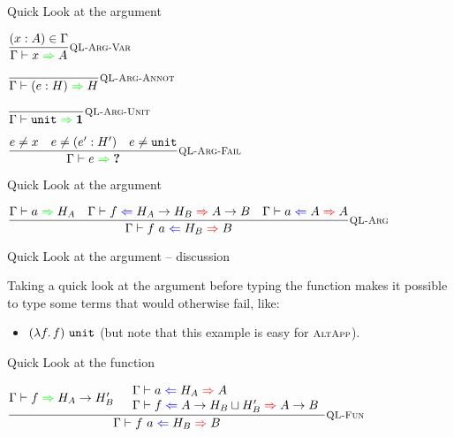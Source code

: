 \documentclass{beamer}
\begin{document}
\begin{frame}{Quick Look at the argument}

\begin{center}
  $\infrule[QL-Arg-Var]{\sidecond{(x : A) \in \Gamma}}{\quicklookinfer{x}{A}}$

  \vspace{2em}

  $\infrule[QL-Arg-Annot]{}{\quicklookinfer{\annot{e}{H}}{H}}$

  \vspace{2em}

  $\infrule[QL-Arg-Unit]{}{\quicklookinfer{\unit}{\Unit}}$

  \vspace{2em}

  $\infrule[QL-Arg-Fail]{\sidecond{e \neq x} \quad \sidecond{e \neq \annot{e'}{H'}} \quad \sidecond{e \neq \unit}}{\quicklookinfer{e}{\Hole}}$
\end{center}

\end{frame}

\begin{frame}{Quick Look at the argument}

\begin{center}
  $\infrule[QL-Arg]{\quicklookinfer{a}{H_A} \quad \hinting{f}{\Fun{H_A}{H_B}}{\Fun{A}{B}} \quad \hinting{a}{A}{A}}{\hinting{\app{f}{a}}{H_B}{B}}$
\end{center}

\end{frame}

\begin{frame}{Quick Look at the argument -- discussion}

Taking a quick look at the argument before typing the function makes it possible to type some terms that would otherwise fail, like:

\begin{itemize}
  \item $(\lambda f.\, f)\ \texttt{unit}$ (but note that this example is easy for $\textsc{\footnotesize{AltApp}}$).
\end{itemize}

\end{frame}

\begin{frame}{Quick Look at the function}

\begin{center}
  $\infrule[QL-Fun]{\quicklookinfer{f}{\Fun{H_A}{H_B'}} \quad \begin{array}{l} \hinting{a}{H_A}{A} \\ \hinting{f}{\Fun{A}{\hintlub{H_B}{H_B'}}}{\Fun{A}{B}} \end{array}}{\hinting{\app{f}{a}}{H_B}{B}}$
\end{center}

\end{frame}
\end{document}
